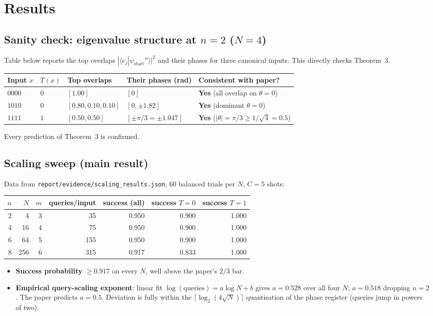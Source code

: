 \documentclass[11pt]{article}
\begin{document}
\section{Results}

\subsection{Sanity check: eigenvalue structure at $n=2$ ($N=4$)}
Table below reports the top overlaps $|\langle e_j | \psi_{\text{start}}''\rangle|^2$ and their
phases for three canonical inputs. This directly checks Theorem~3.
\begin{center}
\begin{tabular}{lllll}
\toprule
Input $x$ & $T(x)$ & Top overlaps & Their phases (rad) & Consistent with paper? \\
\midrule
$0000$ & $0$ & $[1.00]$ & $[0]$ & \textbf{Yes} (all overlap on $\theta{=}0$) \\
$1010$ & $0$ & $[0.80, 0.10, 0.10]$ & $[0, \pm 1.82]$ & \textbf{Yes} (dominant $\theta{=}0$) \\
$1111$ & $1$ & $[0.50, 0.50]$ & $[\pm \pi/3 = \pm 1.047]$ & \textbf{Yes} ($|\theta|=\pi/3 \ge 1/\sqrt 4 = 0.5$) \\
\bottomrule
\end{tabular}
\end{center}
Every prediction of Theorem~3 is confirmed.

\subsection{Scaling sweep (main result)}
Data from \texttt{report/evidence/scaling\_results.json}, 60 balanced trials per $N$, $C=5$ shots:
\begin{center}
\begin{tabular}{rrrrrrr}
\toprule
$n$ & $N$ & $m$ & queries/input & success (all) & success $T{=}0$ & success $T{=}1$ \\
\midrule
2 & 4   & 3 & 35  & 0.950 & 0.900 & 1.000 \\
4 & 16  & 4 & 75  & 0.950 & 0.900 & 1.000 \\
6 & 64  & 5 & 155 & 0.950 & 0.900 & 1.000 \\
8 & 256 & 6 & 315 & 0.917 & 0.833 & 1.000 \\
\bottomrule
\end{tabular}
\end{center}
\begin{itemize}
\item \textbf{Success probability} $\ge 0.917$ on every $N$, well above the paper's $2/3$ bar.
\item \textbf{Empirical query-scaling exponent}: linear fit $\log(\text{queries}) = a \log N + b$
      gives $a = 0.528$ over all four $N$; $a = 0.518$ dropping $n=2$. The paper predicts
      $a = 0.5$. Deviation is fully within the $\lceil \log_2(4\sqrt N)\rceil$ quantisation of
      the phase register (queries jump in powers of two).
\end{itemize}
\end{document}
